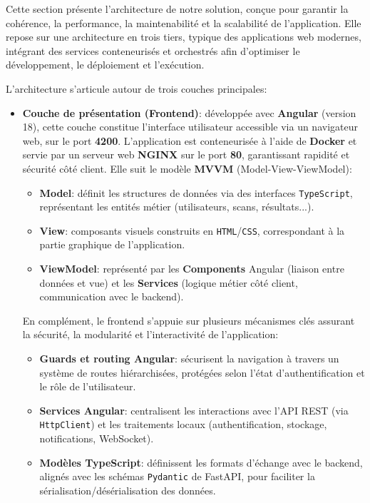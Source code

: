 Cette section présente l’architecture de notre solution, conçue pour garantir la cohérence, la performance, la maintenabilité et la scalabilité de l’application. Elle repose sur une architecture en trois tiers, typique des applications web modernes, intégrant des services conteneurisés et orchestrés afin d’optimiser le développement, le déploiement et l’exécution.

L’architecture s’articule autour de trois couches principales:
\begin{itemize}[label=$-$]
    \item \textbf{Couche de présentation (Frontend)}: développée avec \textbf{Angular} (version 18), cette couche constitue l’interface utilisateur accessible via un navigateur web, sur le port \textbf{4200}. L’application est conteneurisée à l’aide de \textbf{Docker} et servie par un serveur web \textbf{NGINX} sur le port \textbf{80}, garantissant rapidité et sécurité côté client. Elle suit le modèle \textbf{\acs{MVVM}} (Model-View-ViewModel)\cite{mvvm}:
            \begin{itemize}[label=$\circ$]
                    \item \textbf{Model}: définit les structures de données via des interfaces \texttt{TypeScript}, représentant les entités métier (utilisateurs, scans, résultats...).
                    \item \textbf{View}: composants visuels construits en \texttt{HTML}/\texttt{CSS}, correspondant à la partie graphique de l’application.
                    \item \textbf{ViewModel}: représenté par les \textbf{Components} Angular (liaison entre données et vue) et les \textbf{Services} (logique métier côté client, communication avec le backend).
            \end{itemize}
        En complément, le frontend s’appuie sur plusieurs mécanismes clés assurant la sécurité, la modularité et l’interactivité de l’application:
        \begin{itemize}[label=$\circ$]
            \item \textbf{Guards et routing Angular}: sécurisent la navigation à travers un système de routes hiérarchisées, protégées selon l’état d’authentification et le rôle de l’utilisateur.
            \item \textbf{Services Angular}: centralisent les interactions avec l’API REST (via \texttt{HttpClient}) et les traitements locaux (authentification, stockage, notifications, WebSocket).
            \item \textbf{Modèles TypeScript}: définissent les formats d’échange avec le backend, alignés avec les schémas \texttt{Pydantic} de FastAPI, pour faciliter la sérialisation/désérialisation des données.

\end{itemize}
\end{itemize}
